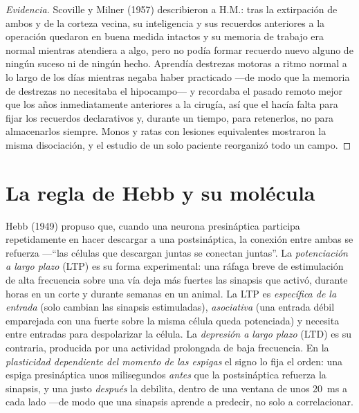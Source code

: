 \begin{proof}[Evidencia]
Scoville y Milner (1957) describieron a H.M.: tras la extirpación de
ambos  y de la corteza vecina, su inteligencia y sus
recuerdos anteriores a la operación quedaron en buena medida intactos y
su memoria de trabajo era normal mientras atendiera a algo, pero no
podía formar recuerdo nuevo alguno de ningún suceso ni de ningún hecho.
Aprendía destrezas motoras a ritmo normal a lo largo de los días
mientras negaba haber practicado ---de modo que la memoria de destrezas
no necesitaba el hipocampo--- y recordaba el pasado remoto mejor que
los años inmediatamente anteriores a la cirugía, así que el 
hacía falta para fijar los recuerdos declarativos y, durante un tiempo,
para retenerlos, no para almacenarlos siempre. Monos y ratas con
lesiones equivalentes mostraron la misma disociación, y el estudio de
un solo paciente reorganizó todo un campo.
\end{proof}

\section{La regla de Hebb y su molécula}

\begin{definition}\label{def:b3:learning-memory:ltp}
Hebb (1949) propuso que, cuando una neurona presináptica participa
repetidamente en hacer descargar a una postsináptica, la conexión entre
ambas se refuerza ---``las células que descargan juntas se conectan
juntas''. La \emph{potenciación a largo plazo} (LTP) es su forma
experimental: una ráfaga breve de estimulación de alta frecuencia sobre
una vía deja más fuertes las sinapsis que activó, durante horas en un
corte y durante semanas en un animal. La LTP es \emph{específica de la
entrada} (solo cambian las sinapsis estimuladas), \emph{asociativa}
(una entrada débil emparejada con una fuerte sobre la misma célula
queda potenciada) y necesita \emph{} entre entradas para
despolarizar la célula. La \emph{depresión a largo plazo} (LTD) es su
contraria, producida por una actividad prolongada de baja frecuencia.
En la \emph{plasticidad dependiente del momento de las espigas} el
signo lo fija el orden: una espiga presináptica unos milisegundos
\emph{antes} que la postsináptica refuerza la sinapsis, y una justo
\emph{después} la debilita, dentro de una ventana de unos
\qty{20}{ms} a cada lado ---de modo que una sinapsis aprende a
predecir, no solo a correlacionar.
\end{definition}

